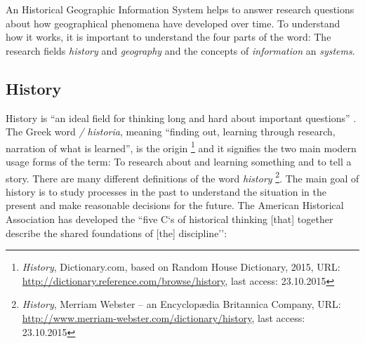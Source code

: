 An Historical Geographic Information System helps to answer research questions about how geographical phenomena have developed over time. To understand how it works, it is important to understand the four parts of the word: The research fields \emph{history} and \emph{geography} and the concepts of \emph{information} an \emph{systems}.


\subsection{History} %
\label{sub:history}

History is ``an ideal field for thinking long and hard about important questions''
\cite{ahaFiveCs}.
The Greek word \emph{\textIota\textsigma\texttau\textomikron\textrho\textiota\textalpha / historia}, meaning ``finding out, learning through research, narration of what is learned'', is the origin
\footnote{
  \emph{History},
  Dictionary.com, based on Random House Dictionary, 2015,
  URL: \url{http://dictionary.reference.com/browse/history},
  last access: 23.10.2015
}
and it signifies the two main modern usage forms of the term: To research about and learning something and to tell a story. There are many different definitions of the word \emph{history}
\footnote{
  \emph{History},
  Merriam Webster -- an Encyclopædia Britannica Company,
  URL: \url{http://www.merriam-webster.com/dictionary/history},
  last access: 23.10.2015
}.
The main goal of history is to study processes in the past to understand the situation in the present and make reasonable decisions for the future. The American Historical Association has developed the ``five C`s of historical thinking [that] together describe the shared foundations of [the] discipline''\cite{ahaFiveCs}:

